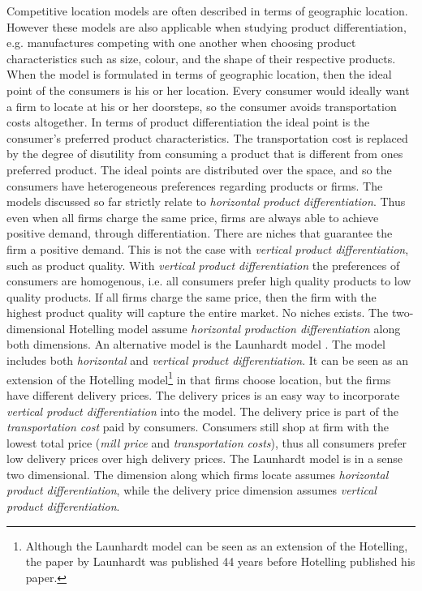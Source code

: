 \documentclass[preprint, 12pt]{elsarticle}
\begin{document}
Competitive location models are often described in terms of geographic location. However these models are also applicable when studying product differentiation, e.g. manufactures competing with one another when choosing product characteristics such as size, colour, and the shape of their respective products. When the model is formulated in terms of geographic location, then the ideal point of the consumers is his or her location. Every consumer would ideally want a firm to locate at his or her doorsteps, so the consumer avoids transportation costs altogether. In terms of product differentiation the ideal point is the consumer's preferred product characteristics. The transportation cost is replaced by the degree of disutility from consuming a product that is different from ones preferred product. The ideal points are distributed over the space, and so the consumers have heterogeneous preferences regarding products or firms. The models discussed so far strictly relate to \emph{horizontal product differentiation}. Thus even when all firms charge the same price, firms are always able to achieve positive demand, through differentiation. There are niches that guarantee the firm a positive demand. This is not the case with \emph{vertical product differentiation}, such as product quality. With \emph{vertical product differentiation} the preferences of consumers are homogenous, i.e. all consumers prefer high quality products to low quality products. If all firms charge the same price, then the firm with the highest product quality will capture the entire market. No niches exists. The two-dimensional Hotelling model assume \emph{horizontal production differentiation} along both dimensions. An alternative model is the Launhardt model \citep{Ferreira_Thisse_1996}. The model includes both \emph{horizontal} and \emph{vertical product differentiation}. It can be seen as an extension of the Hotelling model\footnote{Although the Launhardt model can be seen as an extension of the Hotelling, the paper by Launhardt was published 44 years before Hotelling published his paper.} in that firms choose location, but the firms have different delivery prices. The delivery prices is an easy way to incorporate \emph{vertical product differentiation} into the model. The delivery price is part of the \emph{transportation cost} paid by consumers. Consumers still shop at firm with the lowest total price (\emph{mill price} and \emph{transportation costs}), thus all consumers prefer low delivery prices over high delivery prices. The Launhardt model is in a sense two dimensional. The dimension along which firms locate assumes \emph{horizontal product differentiation}, while the delivery price dimension assumes \emph{vertical product differentiation}.
\end{document}
